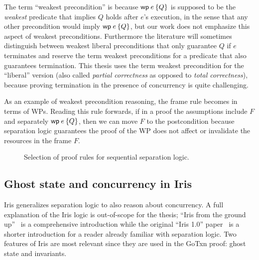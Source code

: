 The term ``weakest precondition'' is because $\wpre{e}{Q}$ is supposed to be the
\emph{weakest} predicate that implies $Q$ holds after $e$'s execution, in the
sense that any other precondition would imply $\wpre{e}{Q}$, but our work does not
emphasize this aspect of weakest preconditions. Furthermore the literature will
sometimes distinguish between weakest liberal preconditions that only guarantee
$Q$ if $e$ terminates and reserve the term weakest preconditions for a predicate
that also guarantees termination. This thesis uses the term weakest precondition for the
``liberal'' version (also called \emph{partial correctness} as opposed to
\emph{total correctness}), because proving termination in the presence of
concurrency is quite challenging.

As an example of weakest precondition reasoning, the frame rule becomes
 in terms of WPs. Reading this rule forwards, if in a proof
the assumptions include $F$
and separately $\wpre{e}{Q}$, then we can move $F$ to the postcondition because
separation logic guarantees the proof of the WP does not affect or invalidate
the resources in the frame $F$.

\begin{figure}
\caption{Selection of proof rules for sequential separation logic.}
\label{fig:wp-rules}
\end{figure}

\subsection{Ghost state and concurrency in Iris}
\label{sec:perennial:concurrency}

Iris generalizes separation logic to also reason about concurrency. A full
explanation of the Iris logic is out-of-scope for the thesis; ``Iris from the
ground up''~\cite{jung:iris-jfp} is a comprehensive introduction while the
original ``Iris 1.0'' paper~\cite{jung:iris-1} is a shorter introduction for a
reader already familiar with separation logic. Two features of Iris are most
relevant since they are used in the GoTxn proof: ghost state and invariants.

